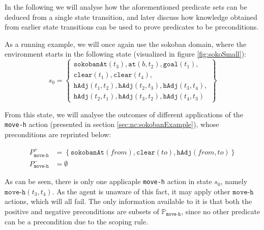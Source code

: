 \documentclass[../Master.tex]{subfiles}
\begin{document}
In the following we will analyse how the aforementioned predicate sets can be deduced from a single state transition, and later discuss how knowledge obtained from earlier state transitions can be used to prove predicates to be preconditions.

\begin{example} \label{ex:ncp:sokobanSetup}
    As a running example, we will once again use the sokoban domain, where the environment starts in the following state (visualized in figure \ref{fig:sokoSmall}):
    \begin{equation*}
        s_0 =
        \left\{
            \begin{gathered}
                \texttt{sokobanAt}(t_3), \texttt{at}(b, t_2), \texttt{goal}(t_1), \\
                \texttt{clear}(t_1), \texttt{clear}(t_4), \\
                \texttt{hAdj}(t_1, t_2), \texttt{hAdj}(t_2, t_3),
                \texttt{hAdj}(t_3, t_4), \\
                \texttt{hAdj}(t_2, t_1), \texttt{hAdj}(t_3, t_2),
                \texttt{hAdj}(t_4, t_3)
            \end{gathered}
        \right\}
    \end{equation*}

    From this state, we will analyse the outcomes of different applications of the \texttt{move-h} action (presented in section \ref{sec:nc:sokobanExample}), whose preconditions are reprinted below:

    \begin{align*}
        P_{\texttt{move-h}}^+ &= \left\{
            \texttt{sokobanAt}(from), \texttt{clear}(to), \texttt{hAdj}(from, to)
            \right\} \\
        P_{\texttt{move-h}}^- &= \emptyset
    \end{align*}

    As can be seen, there is only one applicaple \texttt{move-h} action in state $s_0$, namely $\texttt{move-h}(t_3,t_4)$. As the agent is unaware of this fact, it may apply other $\texttt{move-h}$ actions, which will all fail. The only information available to it is that both the positive and negative preconditions are subsets of $\mathbb{P}_{\texttt{move-h}}$, since no other predicate can be a precondition due to the scoping rule.


\end{example}
\end{document}
